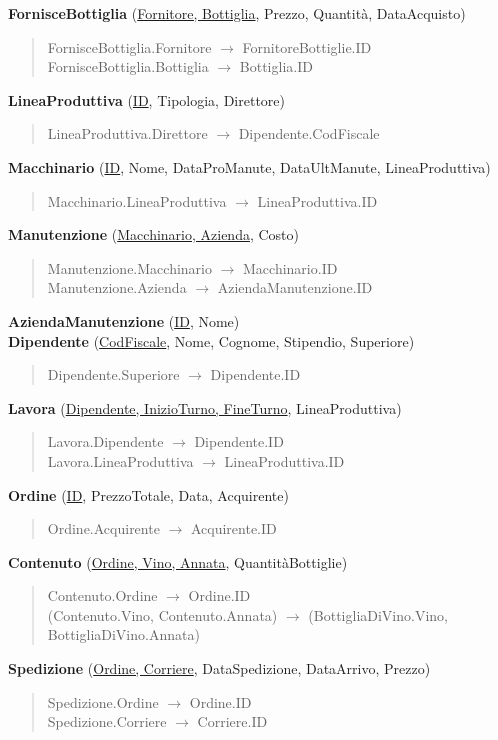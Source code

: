 \textbf{FornisceBottiglia} (\underline{Fornitore, Bottiglia}, Prezzo, Quantità, DataAcquisto)
\begin{verse}
	FornisceBottiglia.Fornitore $\to$ FornitoreBottiglie.ID\\
	FornisceBottiglia.Bottiglia $\to$ Bottiglia.ID
\end{verse} 
\textbf{LineaProduttiva} (\underline{ID}, Tipologia, Direttore)
\begin{verse}
	LineaProduttiva.Direttore $\to$ Dipendente.CodFiscale
\end{verse} 
\textbf{Macchinario} (\underline{ID}, Nome, DataProManute, DataUltManute, LineaProduttiva)
\begin{verse}
	Macchinario.LineaProduttiva $\to$ LineaProduttiva.ID
\end{verse} 
\textbf{Manutenzione} (\underline{Macchinario, Azienda}, Costo)
\begin{verse}
	Manutenzione.Macchinario $\to$ Macchinario.ID\\
	Manutenzione.Azienda $\to$ AziendaManutenzione.ID
\end{verse} 
\textbf{AziendaManutenzione} (\underline{ID}, Nome)\\
\textbf{Dipendente} (\underline{CodFiscale}, Nome, Cognome, Stipendio, Superiore)
\begin{verse}
	Dipendente.Superiore $\to$ Dipendente.ID
\end{verse} 
\textbf{Lavora} (\underline{Dipendente, InizioTurno, FineTurno}, LineaProduttiva)
\begin{verse}
	Lavora.Dipendente $\to$ Dipendente.ID\\
	Lavora.LineaProduttiva $\to$ LineaProduttiva.ID
\end{verse} 
\textbf{Ordine} (\underline{ID}, PrezzoTotale, Data, Acquirente)
\begin{verse}
	Ordine.Acquirente $\to$ Acquirente.ID
\end{verse} 
\textbf{Contenuto} (\underline{Ordine, Vino, Annata}, QuantitàBottiglie)
\begin{verse}
	Contenuto.Ordine $\to$ Ordine.ID\\
	(Contenuto.Vino, Contenuto.Annata) $\to$ (BottigliaDiVino.Vino, BottigliaDiVino.Annata)
\end{verse} 
\textbf{Spedizione} (\underline{Ordine, Corriere}, DataSpedizione, DataArrivo, Prezzo)
\begin{verse}
	Spedizione.Ordine $\to$ Ordine.ID\\
	Spedizione.Corriere $\to$ Corriere.ID
\end{verse} 
